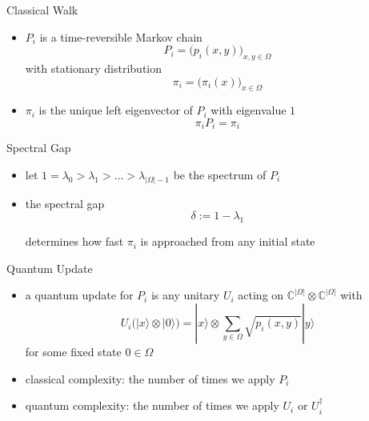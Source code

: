 \documentclass[slideColor]{prosper}
\newcommand{\C}{\mathbb C}
\renewcommand{\>}{\rangle}
\newcommand{\<}{\langle}
\begin{document}

\begin{slide}{Classical Walk}
\begin{itemize}
\item $P_i$ is a time-reversible Markov chain 
\[
P_i=\Big(p_i(x,y)\Big)_{x,y\in\Omega}
\]
with stationary distribution 
\[
\pi_i=\Big(\pi_i(x)\Big)_{x\in\Omega}
\]

\item $\pi_i$ is the unique left eigenvector of $P_i$ with eigenvalue $1$
\[
\pi_i P_i = \pi_i
\]

\end{itemize}
\end{slide}


\begin{slide}{Spectral Gap}

\begin{itemize}

\item let $1=\lambda_0 > \lambda_1 > \ldots > \lambda_{|\Omega|-1}$ be the spectrum of $P_i$

\bigskip
\item the spectral gap 
\[
\delta := 1 - \lambda_1
\]

\medskip
determines how fast $\pi_i$ is approached from any initial state
\end{itemize}
\end{slide}


\begin{slide}{Quantum Update}

\begin{itemize}
\item a quantum update for $P_i$ is any unitary $U_i$ acting on $\C^{|\Omega|}\otimes\C^{|\Omega|}$ with
\begin{equation*}
U_i \Big( |x\> \otimes |0\> \Big) = 
|x\> \otimes 
\sum_{y\in\Omega} \sqrt{p_i(x,y)} |y\> 
\end{equation*}
for some fixed state $0\in\Omega$

\bigskip
\item classical complexity: the number of times we apply $P_i$

\bigskip
\item quantum complexity: the number of times we apply $U_i$ or $U_i^\dagger$
\end{itemize}
\end{slide}
\end{document}
